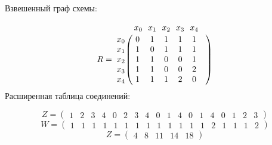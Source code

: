 \documentclass{article}
\begin{document}
Взвешенный граф схемы:
\begin{figure}[h!]
\end{figure}
$$
R =
\bordermatrix{ & x_{0} \!&\! x_{1} \!&\! x_{2} \!&\! x_{3} \!&\! x_{4} \!&\! \cr 
x_{0} \!&\! 0 \!&\! 1 \!&\! 1 \!&\! 1 \!&\! 1 \!&\! \cr
x_{1} \!&\! 1 \!&\! 0 \!&\! 1 \!&\! 1 \!&\! 1 \!&\! \cr
x_{2} \!&\! 1 \!&\! 1 \!&\! 0 \!&\! 0 \!&\! 1 \!&\! \cr
x_{3} \!&\! 1 \!&\! 1 \!&\! 0 \!&\! 0 \!&\! 2 \!&\! \cr
x_{4} \!&\! 1 \!&\! 1 \!&\! 1 \!&\! 2 \!&\! 0 \!&\! \cr
}$$
Расширенная таблица соединений:

$$
 Z =\left(
\begin{array}{cccccccccccccccccc}
1 \!&\! 2 \!&\! 3 \!&\! 4 \!&\! 0 \!&\! 2 \!&\! 3 \!&\! 4 \!&\! 0 \!&\! 1 \!&\! 4 \!&\! 0 \!&\! 1 \!&\! 4 \!&\! 0 \!&\! 1 \!&\! 2 \!&\! 3 
\end{array}
\right)$$
$$
 W =\left(
\begin{array}{cccccccccccccccccc}
1 \!&\! 1 \!&\! 1 \!&\! 1 \!&\! 1 \!&\! 1 \!&\! 1 \!&\! 1 \!&\! 1 \!&\! 1 \!&\! 1 \!&\! 1 \!&\! 1 \!&\! 2 \!&\! 1 \!&\! 1 \!&\! 1 \!&\! 2 
\end{array}
\right)$$
$$
 Z =\left(
\begin{array}{ccccc}
4 \!&\! 8 \!&\! 11 \!&\! 14 \!&\! 18 
\end{array}
\right)$$
\end{document}
